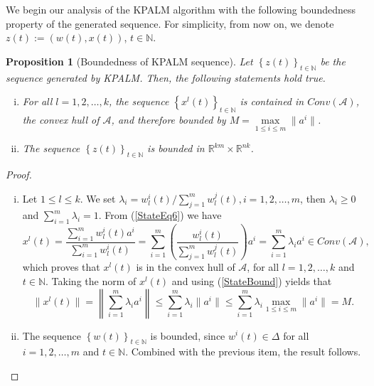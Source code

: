 \documentclass[12pt]{article}
\numberwithin{equation}{section}
\newtheorem{proposition}{Proposition}[section]
\begin{document}
We begin our analysis of the KPALM algorithm with the following boundedness property of the generated sequence. For simplicity, from now on, we denote $z(t):=\left( w(t),x(t) \right)$, $t \in \mathbb{N}$.
\begin{proposition}[Boundedness of KPALM sequence] \label{boundedness_prop}
Let $\left\lbrace z(t) \right\rbrace_{t \in \mathbb{N}}$ be the sequence generated by KPALM. Then, the following statements hold true.
\begin{enumerate}[(i)]
	\item For all $l=1, 2, \ldots ,k$, the sequence $\left\lbrace x^l(t) \right\rbrace_{t \in \mathbb{N}}$ is contained in $Conv(\mathcal{A})$, the convex hull of $\mathcal{A}$, and therefore bounded by $M = \max\limits_{1 \leq i \leq m} \| a^i \|$. \label{boundedness_prop_1}
	\item The sequence $\left\lbrace z(t) \right\rbrace_{t \in \mathbb{N}}$ is bounded in $\mathbb{R}^{km} \times \mathbb{R}^{nk}$.
\end{enumerate}
\end{proposition}

\begin{proof}
\begin{enumerate}[(i)]
	\item  Let $1\leq l \leq k$. We set $\lambda_i = w^i_l(t)/\sum\limits_{j=1}^{m} w^j_l(t), i=1, 2, \ldots ,m$, then $\lambda_i \geq 0$ and $\sum\limits_{i=1}^{m} \lambda_i = 1$. From (\ref{StateEq6}) we have
	\begin{equation}
		x^l(t) = \frac{\sum_{i=1}^{m} w^i_l(t) a^i}{\sum_{i=1}^{m} w^i_l(t)} 
		= \sum_{i=1}^{m} \left( \frac{ w^i_l(t)}{\sum_{j=1}^{m} w^j_l(t)} \right) a^i 
		= \sum\limits_{i=1}^{m} \lambda_i a^i \in Conv(\mathcal{A}), \label{StateBound}
	\end{equation}
	which proves that $x^l(t)$ is in the convex hull of $\mathcal{A}$, for all $l = 1, 2, \ldots, k$ and $t \in \mathbb{N}$. Taking the norm of $x^l(t)$ and using (\ref{StateBound}) yields that
	\begin{equation*}
		\| x^l(t) \| = \left\lVert \sum_{i=1}^{m} \lambda_i a^i \right\lVert
		\leq \sum_{i=1}^{m} \lambda_i \| a^i \|
		\leq \sum_{i=1}^{m} \lambda_i \max\limits_{1 \leq i \leq m} \| a^i \| = M .
	\end{equation*}
	\item The sequence $\left\lbrace w(t) \right\rbrace_{t \in \mathbb{N}}$ is bounded, since $w^i(t) \in \Delta$ for all $i=1, 2, \ldots ,m$ and $t \in \mathbb{N}$. Combined with the previous item, the result follows.
\end{enumerate} 
\end{proof}
\end{document}

